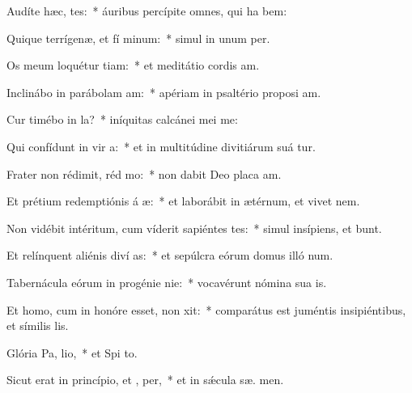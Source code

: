 \item Audíte hæc,  tes:~* áuribus percípite omnes, qui ha bem:
\item Quique terrígenæ, et fí minum:~* simul in unum   per.
\item Os meum loquétur tiam:~* et meditátio cordis  am.
\item Inclinábo in parábolam  am:~* apériam in psaltério proposi am.
\item Cur timébo in  la?~* iníquitas calcánei mei  me:
\item Qui confídunt in vir a:~* et in multitúdine divitiárum suá tur.
\item Frater non rédimit, réd mo:~* non dabit Deo placa am.
\item Et prétium redemptiónis á æ:~* et laborábit in ætérnum, et vivet   nem.
\item Non vidébit intéritum, cum víderit sapiéntes tes:~* simul insípiens, et  bunt.
\item Et relínquent aliénis diví as:~* et sepúlcra eórum domus illó  num.
\item Tabernácula eórum in progénie  nie:~* vocavérunt nómina sua   is.
\item Et homo, cum in honóre esset, non xit:~* comparátus est juméntis insipiéntibus, et símilis   lis.
\item Glória Pa,  lio,~* et Spi to.
\item Sicut erat in princípio, et ,  per,~* et in sǽcula sæ. men.
